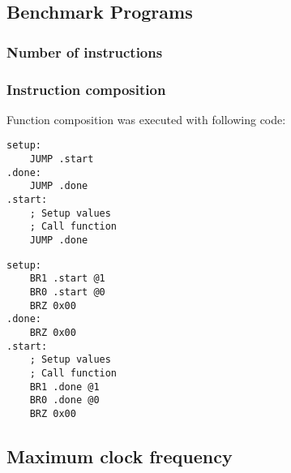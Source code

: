 \iffalse
This chapter looks specifically at your results.
* You measured some samples. 
What values did you measure? 
Present them in a table or graph? 
How did you test whether they were good measurements? 
Were you looking to improve something? 
Are your new samples better than the old ones?

* You built a device; 
what tests did you run to make sure that it is running correctly?

* You calculated something or developed a new theory about something. 
How do you know how well it predicts? 
What tests did you run? 
What comparisons with the literature did you make?
* You coded or simulated something. 
What tests did you run to be sure it was working correctly? 

Describe what you want the reader to notice in the results. 
Give the facts, then give your analysis of the facts.
Present your graphs, figures, tables, photos, and equations needed to show what you accomplished.
Label everything clearly, using the recommendations given below in “Things to Look For”
\fi

\subsection{Benchmark Programs}



\subsubsection{Number of instructions}

\subsubsection{Instruction composition}
Function composition was executed with following code:

\begin{lstlisting}[frame=single, caption={RISC assembly frame for executring tests}, emph={setup,start,done}]
setup:
	JUMP .start
.done:
	JUMP .done
.start:
	; Setup values
	; Call function
	JUMP .done
\end{lstlisting}

\begin{lstlisting}[frame=single, caption={OISC assembly frame for executring tests}, emph={setup,start,done}]
setup:
	BR1 .start @1
	BR0 .start @0
	BRZ 0x00
.done:
	BRZ 0x00
.start:
	; Setup values
	; Call function
	BR1 .done @1
	BR0 .done @0
	BRZ 0x00
\end{lstlisting}



\subsection{Maximum clock frequency}

\subsection{}
